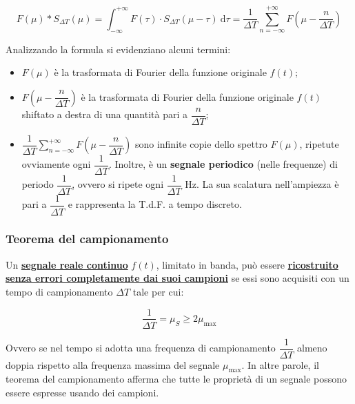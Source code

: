 \documentclass[a4paper]{article}
\begin{document}
	\begin{equation*}
		F\left(\mu\right) * S_{\Delta T}\left(\mu\right) = \int_{-\infty}^{+\infty} F\left(\tau\right) \cdot S_{\Delta T} \left(\mu - \tau\right) \: \mathrm{d}\tau = \dfrac{1}{\Delta T} \sum_{n = -\infty}^{+\infty} F \left(\mu - \dfrac{n}{\Delta T}\right)
	\end{equation*}

	\noindent
	Analizzando la formula si evidenziano alcuni termini:
	
	\begin{itemize}
		\item $F\left(\mu\right)$ è la trasformata di Fourier della funzione originale $f\left(t\right)$;
		
		\item $F\left(\mu - \dfrac{n}{\Delta T}\right)$ è la trasformata di Fourier della funzione originale $f\left(t\right)$ shiftato a destra di una quantità pari a $\dfrac{n}{\Delta T}$;
		
		\item $\dfrac{1}{\Delta T} \sum_{n = -\infty}^{+\infty} F \left(\mu - \dfrac{n}{\Delta T}\right)$ sono infinite copie dello spettro $F\left(\mu\right)$, ripetute ovviamente ogni $\dfrac{1}{\Delta T}$. \newline
		Inoltre, è un \textbf{segnale periodico} (nelle frequenze) di periodo $\dfrac{1}{\Delta T}$, ovvero si ripete ogni $\dfrac{1}{\Delta T}$ Hz.\newline
		La sua scalatura nell'ampiezza è pari a $\dfrac{1}{\Delta T}$ e rappresenta la T.d.F. a tempo discreto.
	\end{itemize}

	\newpage
	
	\subsubsection{Teorema del campionamento}
	
	Un \textbf{\underline{segnale reale continuo}} $f\left(t\right)$, limitato in banda, può essere \textbf{\underline{ricostruito}} \textbf{\underline{senza errori completamente dai suoi campioni}} se essi sono acquisiti con un tempo di campionamento $\Delta T$ tale per cui:
	
	\begin{equation*}
		\dfrac{1}{\Delta T} = \mu_{S} \ge 2 \mu_{\text{max}}
	\end{equation*}

	\noindent
	Ovvero se nel tempo si adotta una frequenza di campionamento $\dfrac{1}{\Delta T}$ almeno doppia rispetto alla frequenza massima del segnale $\mu_{\text{max}}$.\newline
	In altre parole, il teorema del campionamento afferma che tutte le proprietà di un segnale possono essere espresse usando dei campioni.\newline
	
\end{document}
